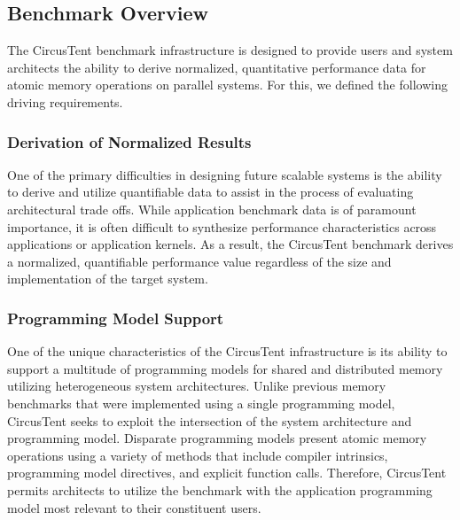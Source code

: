 

\subsection{Benchmark Overview}
\label{subsec:benchmark_overview}

The CircusTent benchmark infrastructure is designed to provide users and system architects the ability to derive normalized, quantitative performance data for atomic memory operations on parallel systems.  For this, we defined the following driving requirements.  

\subsubsection*{Derivation of Normalized Results}

One of the primary difficulties in designing future scalable systems is the ability to derive and utilize quantifiable data to assist in the process of evaluating architectural trade offs.
While application benchmark data is of paramount importance, it is often difficult to synthesize performance characteristics across applications or application kernels.
As a result, the CircusTent benchmark derives a normalized, quantifiable performance value regardless of the size and implementation of the target system.  

\subsubsection*{Programming Model Support}

One of the unique characteristics of the CircusTent infrastructure is its ability to support a multitude of programming models for shared and distributed memory utilizing heterogeneous system architectures.
Unlike previous memory benchmarks that were implemented using a single programming model, CircusTent seeks to exploit the intersection of the system architecture and programming model.
Disparate programming models present atomic memory operations using a variety of methods that include compiler intrinsics, programming model directives, and explicit function calls.
Therefore, CircusTent permits architects to utilize the benchmark with the application programming model most relevant to their constituent users. 

